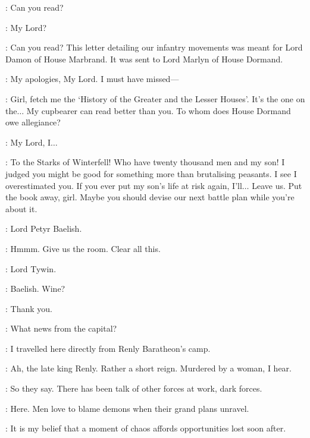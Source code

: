 
\TYWIN: Can you read? 

\AMORY: My Lord? 

\TYWIN: Can you read?  This letter detailing our infantry movements was meant for Lord Damon of House Marbrand. It was sent to Lord Marlyn of House Dormand. 

\AMORY: My apologies, My Lord. I must have missed---

\TYWIN: Girl, fetch me the `History of the Greater and the Lesser Houses'. It's the one on the$\ldots$  My cupbearer can read better than you. To whom does House Dormand owe allegiance? 

\AMORY: My Lord, I$\ldots$ 

\TYWIN: To the Starks of Winterfell! Who have twenty thousand men and my son! I judged you might be good for something more than brutalising peasants. I see I overestimated you. If you ever put my son's life at risk again, I'll$\ldots$ Leave us.  Put the book away, girl.  Maybe you should devise our next battle plan while you're about it. 

\HERALD: Lord Petyr Baelish. 

\TYWIN: Hmmm. Give us the room.  Clear all this. 


\LITTLEFINGER: Lord Tywin. 

\TYWIN: Baelish. Wine? 

\LITTLEFINGER: Thank you. 

\TYWIN: What news from the capital? 

\LITTLEFINGER: I travelled here directly from Renly Baratheon's camp. 

\TYWIN: Ah, the late king Renly. Rather a short reign. Murdered by a woman, I hear. 


\LITTLEFINGER: So they say. There has been talk of other forces at work, dark forces. 

\TYWIN:  Here.  Men love to blame demons when their grand plans unravel. 

\LITTLEFINGER: It is my belief that a moment of chaos affords opportunities lost soon after. 

